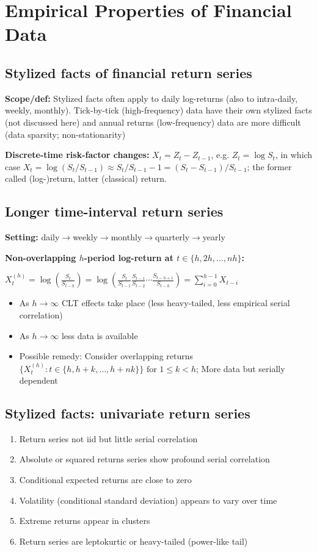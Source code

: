 \section*{Empirical Properties of Financial Data}
\subsection*{Stylized facts of financial return series}
\textbf{Scope/def:} Stylized facts often apply to daily log-returns (also to intra-daily, weekly, monthly). Tick-by-tick (high-frequency) data have their own stylized facts (not discussed here) and annual returns (low-frequency) data are more difficult (data sparsity; non-stationarity)

\textbf{Discrete-time risk-factor changes:} $X_t=Z_t-Z_{t-1}$, e.g. $Z_t=\log S_t$, in which case $X_t=\log(S_t/S_{t-1})\approx S_t/S_{t-1}-1=(S_t-S_{t-1})/S_{t-1}$; the former called (log-)return, latter (classical) return.

\subsection*{Longer time-interval return series}
\textbf{Setting:} daily$\rightarrow$weekly$\rightarrow$monthly$\rightarrow$quarterly$\rightarrow$yearly

\textbf{Non-overlapping $h$-period log-return at $t\in\{h,2h,\dots,nh\}$:}

$X_t^{(h)}=\log(\frac{S_t}{S_{t-h}})=\log(\frac{S_t}{S_{t-1}}\frac{S_{t-1}}{S_{t-2}}\cdots\frac{S_{t-h+1}}{S_{t-h}})=\sum^{h-1}_{i=0}X_{t-i}$

\begin{itemize}
    \item As $h\rightarrow \infty$ CLT effects take place (less heavy-tailed, less empirical serial correlation)
    \item As $h\rightarrow \infty$ less data is available
    \item Possible remedy: Consider overlapping returns
    $\{X^{(h)}_t:t\in \{h, h+k, \dots,h+nk\}\} \text{ for } 1\leq k <h$;
    More data but serially dependent
\end{itemize}

\subsection*{Stylized facts: univariate return series}
\begin{enumerate}[label=(U\arabic*),itemsep=5pt,leftmargin=1cm]
    \item Return series not iid but little serial correlation
    \item Absolute or squared returns series show profound serial correlation
    \item Conditional expected returns are close to zero
    \item Volatility (conditional standard deviation) appears to vary over time
    \item Extreme returns appear in clusters
    \item Return series are leptokurtic or heavy-tailed (power-like tail)
\end{enumerate}

